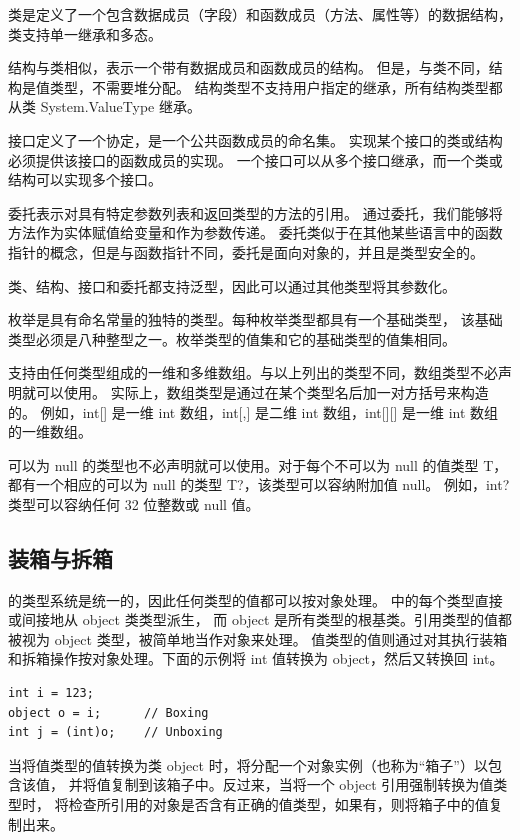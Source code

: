 类是定义了一个包含数据成员（字段）和函数成员（方法、属性等）的数据结构，类支持单一继承和多态。

结构与类相似，表示一个带有数据成员和函数成员的结构。
但是，与类不同，结构是值类型，不需要堆分配。
结构类型不支持用户指定的继承，所有结构类型都从类 System.ValueType 继承。

接口定义了一个协定，是一个公共函数成员的命名集。
实现某个接口的类或结构必须提供该接口的函数成员的实现。
一个接口可以从多个接口继承，而一个类或结构可以实现多个接口。

委托表示对具有特定参数列表和返回类型的方法的引用。
通过委托，我们能够将方法作为实体赋值给变量和作为参数传递。
委托类似于在其他某些语言中的函数指针的概念，但是与函数指针不同，委托是面向对象的，并且是类型安全的。

类、结构、接口和委托都支持泛型，因此可以通过其他类型将其参数化。

枚举是具有命名常量的独特的类型。每种枚举类型都具有一个基础类型，
该基础类型必须是八种整型之一。枚举类型的值集和它的基础类型的值集相同。

\cs  支持由任何类型组成的一维和多维数组。与以上列出的类型不同，数组类型不必声明就可以使用。
实际上，数组类型是通过在某个类型名后加一对方括号来构造的。
例如，int[] 是一维 int 数组，int[,] 是二维 int 数组，int[][] 是一维 int 数组的一维数组。

可以为 null 的类型也不必声明就可以使用。对于每个不可以为 null 的值类型 T，
都有一个相应的可以为 null 的类型 T?，该类型可以容纳附加值 null。
例如，int? 类型可以容纳任何 32 位整数或 null 值。

\subsection{装箱与拆箱}
\cs  的类型系统是统一的，因此任何类型的值都可以按对象处理。 \cs  中的每个类型直接或间接地从 object 类类型派生，
而 object 是所有类型的根基类。引用类型的值都被视为 object 类型，被简单地当作对象来处理。
值类型的值则通过对其执行装箱和拆箱操作按对象处理。下面的示例将 int 值转换为 object，然后又转换回 int。

\begin{lstlisting}
int i = 123;
object o = i;      // Boxing
int j = (int)o;    // Unboxing
\end{lstlisting}

当将值类型的值转换为类 object 时，将分配一个对象实例（也称为“箱子”）以包含该值，
并将值复制到该箱子中。反过来，当将一个 object 引用强制转换为值类型时，
将检查所引用的对象是否含有正确的值类型，如果有，则将箱子中的值复制出来。

